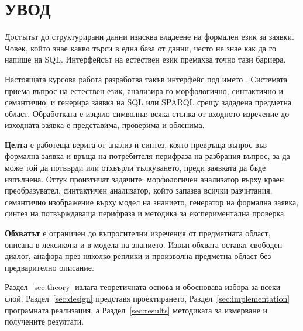 \section*{УВОД}
\label{sec:introduction}

Достъпът до структурирани данни изисква владеене на формален език за заявки. Човек,
който знае какво търси в една база от данни, често не знае как да го напише на SQL.
Интерфейсът на естествен език премахва точно тази бариера.

Настоящата курсова работа разработва такъв интерфейс под името . Системата
приема въпрос на естествен език, анализира го морфологично, синтактично и семантично, и
генерира заявка на SQL или SPARQL срещу зададена предметна област. Обработката е изцяло
символна: всяка стъпка от входното изречение до изходната заявка е представима, проверима
и обяснима.

\textbf{Целта} е работеща верига от анализ и синтез, която превръща въпрос във формална
заявка и връща на потребителя перифраза на разбрания въпрос, за да може той да потвърди
или отхвърли тълкуването, преди заявката да бъде изпълнена. Оттук произтичат задачите:
морфологичен анализатор върху краен преобразувател, синтактичен анализатор, който запазва
всички разчитания, семантично изображение върху модел на знанието, генератор на формална
заявка, синтез на потвърждаваща перифраза и методика за експериментална проверка.

\textbf{Обхватът} е ограничен до въпросителни изречения от предметната област, описана в
лексикона и в модела на знанието. Извън обхвата остават свободен диалог, анафора през
няколко реплики и произволна предметна област без предварително описание.

Раздел~\ref{sec:theory} излага теоретичната основа и обосновава избора за всеки слой.
Раздел~\ref{sec:design} представя проектирането, Раздел~\ref{sec:implementation}
програмната реализация, а Раздел~\ref{sec:results} методиката за измерване и получените
резултати.
